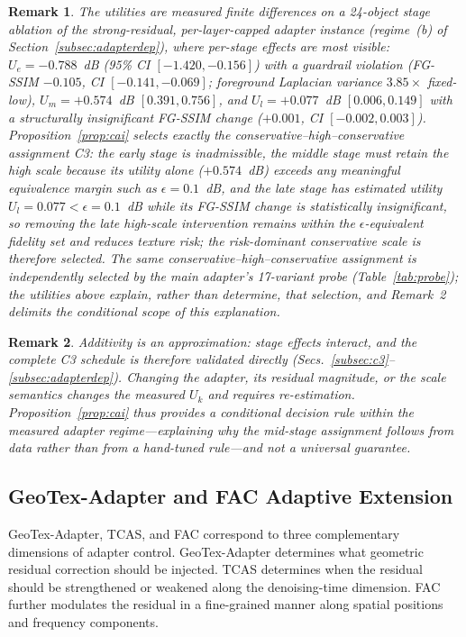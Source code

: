 \documentclass[times,twocolumn,final]{elsarticle}
\newtheorem{remark}{Remark} %
\providecommand{\DIFadd}[1]{{\protect\color{blue} \sf #1}} %
\providecommand{\DIFaddend}{} %
\DeclareRobustCommand{\DIFaddend}{\DIFOaddend \let\includegraphics\DIFOincludegraphics} %
\begin{document}
\begin{remark}
\DIFadd{The utilities are measured finite differences on a 24-object stage ablation of the strong-residual, per-layer-capped adapter instance (regime~(b) of Section~\ref{subsec:adapterdep}), where per-stage effects are most visible: $U_e=-0.788$~dB (95\% CI $[-1.420,-0.156]$) with a guardrail violation (FG-SSIM $-0.105$, CI $[-0.141,-0.069]$; foreground Laplacian variance $3.85\times$ fixed-low), $U_m=+0.574$~dB $[0.391,0.756]$, and $U_l=+0.077$~dB $[0.006,0.149]$ with a structurally insignificant FG-SSIM change ($+0.001$, CI $[-0.002,0.003]$). Proposition~\ref{prop:cai} selects exactly the conservative--high--conservative assignment C3: the early stage is inadmissible, the middle stage must retain the high scale because its utility alone ($+0.574$~dB) exceeds any meaningful equivalence margin such as $\epsilon=0.1$~dB, and the late stage has estimated utility $U_l=0.077<\epsilon=0.1$~dB while its FG-SSIM change is statistically insignificant, so removing the late high-scale intervention remains within the $\epsilon$-equivalent fidelity set and reduces texture risk; the risk-dominant conservative scale is therefore selected. The same conservative--high--conservative assignment is independently selected by the main adapter's 17-variant probe (Table~\ref{tab:probe}); the utilities above explain, rather than determine, that selection, and Remark~2 delimits the conditional scope of this explanation.
}\end{remark}

\begin{remark}
\DIFadd{Additivity is an approximation: stage effects interact, and the complete C3 schedule is therefore validated directly (Secs.~\ref{subsec:c3}--\ref{subsec:adapterdep}). Changing the adapter, its residual magnitude, or the scale semantics changes the measured $U_k$ and requires re-estimation. Proposition~\ref{prop:cai} thus provides a conditional decision rule within the measured adapter regime---explaining why the mid-stage assignment follows from data rather than from a hand-tuned rule---and not a universal guarantee.
}\end{remark}

\DIFaddend \subsection{GeoTex-Adapter and FAC Adaptive Extension}
\label{subsec:fac}

GeoTex-Adapter, TCAS, and FAC correspond to three complementary dimensions of adapter control. GeoTex-Adapter determines what geometric residual correction should be injected. TCAS determines when the residual should be strengthened or weakened along the denoising-time dimension. FAC further modulates the residual in a fine-grained manner along spatial positions and frequency components.
\end{document}
